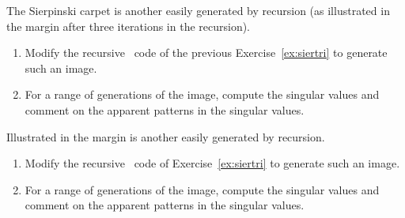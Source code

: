\begin{exercise} \label{ex:} 
The Sierpinski carpet is another  easily generated by recursion (as illustrated in the margin after three iterations in the recursion).
\marginpar{}
\begin{enumerate}
\item Modify the recursive \script\ code of the previous Exercise~\ref{ex:siertri} to generate such an image.

\item For a range of generations of the image, compute the singular values and comment on the apparent patterns in the singular values.
\end{enumerate}
\end{exercise}


\begin{exercise} \label{ex:} 
Illustrated in the margin is another  easily generated by recursion.
\marginpar{}
\begin{enumerate}
\item Modify the recursive \script\ code of Exercise~\ref{ex:siertri} to generate such an image.

\item For a range of generations of the image, compute the singular values and comment on the apparent patterns in the singular values.
\end{enumerate}
\end{exercise}





